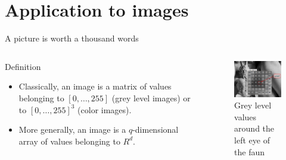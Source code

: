 \documentclass[xcolor=pdftex,dvipsnames,table,mathserif]{beamer}
\begin{document}
\section{Application to images}

\begin{frame}{A picture is worth a thousand words}

  \begin{columns}
    \begin{column}{.5\textwidth}
      \begin{block}{Definition}
        \begin{itemize}
        \item Classically, an image is a matrix of values belonging to $[0, \ldots, 255]$ (grey level images) or to $[0, \ldots, 255]^3$ (color images).
        \item More generally, an image is a $q$-dimensional array of values belonging to $R^d$.
        \end{itemize}
      \end{block}

    \end{column}

    \begin{column}{.5\textwidth}
      \begin{figure}
        \centering
        \includegraphics[width=5cm]{faune.png}\\
        \tiny{Grey level values around the left eye of the faun}
      \end{figure}

    \end{column}
  \end{columns}

\end{frame}
\end{document}
